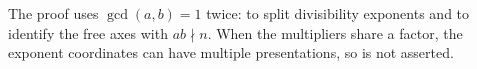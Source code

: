 \begin{remark}\label{rem:coprime}
The proof uses $\gcd(a,b)=1$ twice: to split divisibility exponents and to
identify the free axes with $ab\nmid n$.  When the multipliers share a factor,
the exponent coordinates can have multiple presentations, so
 is not asserted.
\end{remark}
